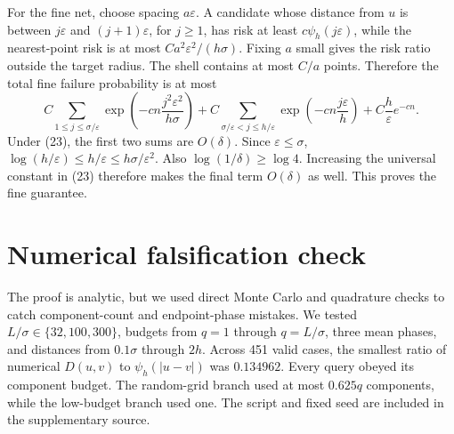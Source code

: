 \documentclass{article}
\theoremstyle{definition}
\theoremstyle{remark}
\newcommand{\1}{\mathbf 1}
\begin{document}
For the fine net, choose spacing \(a\varepsilon\). A candidate whose distance from \(u\) is between \(j\varepsilon\) and \((j+1)\varepsilon\), for \(j\geq1\), has risk at least \(c\psi_h(j\varepsilon)\), while the nearest-point risk is at most \(Ca^2\varepsilon^2/(h\sigma)\). Fixing \(a\) small gives the risk ratio outside the target radius. The shell contains at most \(C/a\) points. Therefore the total fine failure probability is at most \[ C\sum_{1\leq j\leq\sigma/\varepsilon} \exp\left(-cn\frac{j^2\varepsilon^2}{h\sigma}\right) + C\sum_{\sigma/\varepsilon<j\leq h/\varepsilon} \exp\left(-cn\frac{j\varepsilon}{h}\right) + C\frac h\varepsilon e^{-cn}. \tag{34} \] Under (23), the first two sums are \(O(\delta)\). Since \(\varepsilon\leq\sigma\), \(\log(h/\varepsilon)\leq h/\varepsilon\leq h\sigma/\varepsilon^2\). Also \(\log(1/\delta)\geq\log4\). Increasing the universal constant in (23) therefore makes the final term \(O(\delta)\) as well. This proves the fine guarantee.

\section{Numerical falsification check}\label{app:numerics}

The proof is analytic, but we used direct Monte Carlo and quadrature checks to catch component-count and endpoint-phase mistakes. We tested \(L/\sigma\in\{32,100,300\}\), budgets from \(q=1\) through \(q=L/\sigma\), three mean phases, and distances from \(0.1\sigma\) through \(2h\). Across 451 valid cases, the smallest ratio of numerical \(D(u,v)\) to \(\psi_h(|u-v|)\) was \(0.134962\). Every query obeyed its component budget. The random-grid branch used at most \(0.625q\) components, while the low-budget branch used one. The script and fixed seed are included in the supplementary source.
\end{document}
